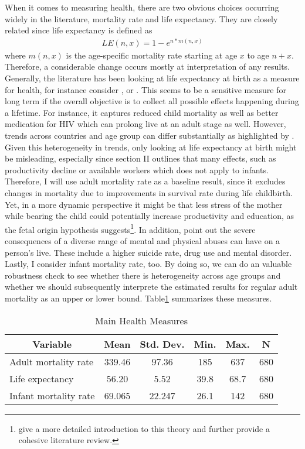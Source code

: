 \documentclass{article}
\begin{document}
When it comes to measuring health, there are two obvious choices occurring widely in the literature, mortality rate and life expectancy. They are closely related since life expectancy is defined as
\begin{align} 
LE(n,x) = 1 - e^{n*m(n,x)}
\end{align}
where $m(n,x)$ is the age-specific mortality rate starting at age $x$ to age $n + x$. Therefore, a considerable change occurs mostly at interpretation of any results. \\
Generally, the literature has been looking at life expectancy at birth as a measure for health, for instance consider \cite{bloom2018health}, \cite{acemoglu2007disease} or \cite{bloom2014disease}. This seems to be a sensitive measure for long term if the overall objective is to collect all possible effects happening during a lifetime. For instance, it captures reduced child mortality as well as better medication for HIV which can prolong live at an adult stage as well. However, trends across countries and age group can differ substantially as highlighted by \cite{mcmichael2004mortality}. Given this heterogeneity in trends, only looking at life expectancy at birth might be misleading, especially since section II outlines that many effects, such as productivity decline or available workers which does not apply to infants. Therefore, I will use adult mortality rate as a baseline result, since it excludes changes in mortality due to improvements in survival rate during life childbirth. \\
Yet, in a more dynamic perspective it might be that less stress of the mother while bearing the child could potentially increase productivity and education, as the fetal origin hypothesis suggests\footnote{ \cite{almond2011killing} give a more detailed introduction to this theory and further provide a cohesive literature review.}. In addition, \cite{norman2012long} point out the severe consequences of a diverse range of mental and physical abuses can have on a person's live. These include a higher suicide rate, drug use and mental disorder. \\
Lastly, I consider infant mortality rate, too. By doing so, we can do an valuable robustness check to see whether there is heterogeneity across age groups and whether we should subsequently interprete the estimated results for regular adult mortality as an upper or lower bound. Table\ref{Main Health Measures} summarizes these measures.

\begin{table}[htbp]\centering \caption{Main Health Measures \label{Main Health Measures}}
\begin{tabular}{l c c c c c}\hline\hline
\multicolumn{1}{c}{\textbf{Variable}} & \textbf{Mean}
 & \textbf{Std. Dev.}& \textbf{Min.} &  \textbf{Max.} & \textbf{N}\\ \hline
Adult mortality rate & 339.46 & 97.36 & 185 & 637 & 680\\
Life expectancy & 56.20 & 5.52 & 39.8 & 68.7 & 680 \\
Infant mortality rate & 69.065 & 22.247 & 26.1 & 142 & 680\\
\hline\end{tabular}
\end{table}
\end{document}
